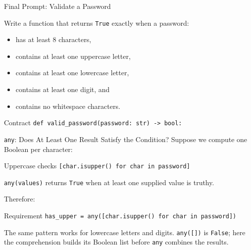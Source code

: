 \documentclass[aspectratio=169,10pt]{beamer}
\begin{document}
\begin{frame}{Final Prompt: Validate a Password}
  \begin{activity}
    Write a function that returns \texttt{True} exactly when a password:
    \begin{itemize}
      \item has at least 8 characters,
      \item contains at least one uppercase letter,
      \item contains at least one lowercase letter,
      \item contains at least one digit, and
      \item contains no whitespace characters.
    \end{itemize}
  \end{activity}

  \begin{block}{Contract}
    \texttt{def valid\_password(password: str) -> bool:}
  \end{block}
\end{frame}

\begin{frame}{\texttt{any}: Does At Least One Result Satisfy the Condition?}
  Suppose we compute one Boolean per character:

  \begin{block}{Uppercase checks}
    \texttt{[char.isupper() for char in password]}
  \end{block}

  \begin{cpdefinition}
    \texttt{any(values)} returns \texttt{True} when at least one supplied value is truthy.
  \end{cpdefinition}

  Therefore:

  \begin{block}{Requirement}
    \texttt{has\_upper = any([char.isupper() for char in password])}
  \end{block}

  The same pattern works for lowercase letters and digits. \texttt{any([])} is \texttt{False}; here the comprehension builds its Boolean list before \texttt{any} combines the results.
\end{frame}
\end{document}
